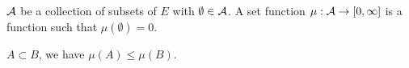 \begin{definition}
    $\mathcal{A}$ be a collection of subsets of $E$ with $\emptyset\in\mathcal{A}$.
    A set function $\mu:\mathcal{A}\to [0,\infty]$ is a function such that $\mu(\emptyset)=0$.
\end{definition}

\begin{definition}
    $A\subset B$, we have $\mu(A)\leq \mu(B)$.
\end{definition}